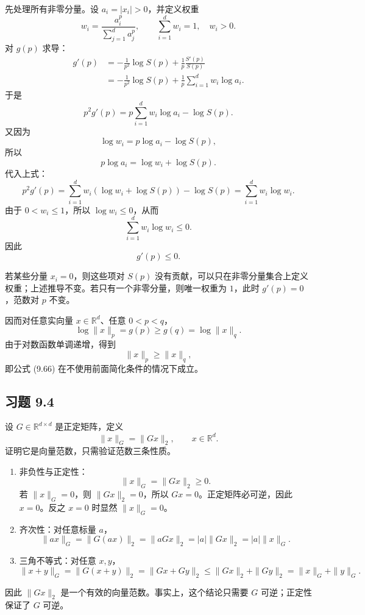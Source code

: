 \documentclass[UTF8,a4paper,12pt]{ctexart}
\begin{document}
\begin{enumerate}
  先处理所有非零分量。设 $a_i=|x_i|>0$，并定义权重
  \[
      w_i=\frac{a_i^p}{\sum_{j=1}^d a_j^p},
      \qquad \sum_{i=1}^d w_i=1,\quad w_i>0.
  \]
  对 $g(p)$ 求导：
  \begin{align*}
      g'(p)
      &=-\frac{1}{p^2}\log S(p)
        +\frac{1}{p}\frac{S'(p)}{S(p)}\\
      &=-\frac{1}{p^2}\log S(p)
        +\frac{1}{p}\sum_{i=1}^d w_i\log a_i.
  \end{align*}
  于是
  \[
      p^2g'(p)
      =
      p\sum_{i=1}^d w_i\log a_i-\log S(p).
  \]
  又因为
  \[
      \log w_i=p\log a_i-\log S(p),
  \]
  所以
  \[
      p\log a_i=\log w_i+\log S(p).
  \]
  代入上式：
  \[
      p^2g'(p)
      =
      \sum_{i=1}^d w_i(\log w_i+\log S(p))-\log S(p)
      =
      \sum_{i=1}^d w_i\log w_i.
  \]
  由于 $0<w_i\le1$，所以 $\log w_i\le0$，从而
  \[
      \sum_{i=1}^d w_i\log w_i\le0.
  \]
  因此
  \[
      g'(p)\le0.
  \]

  若某些分量 $x_i=0$，则这些项对 $S(p)$ 没有贡献，可以只在非零分量集合上定义权重；上述推导不变。若只有一个非零分量，则唯一权重为 $1$，此时 $g'(p)=0$，范数对 $p$ 不变。

  因而对任意实向量 $x\in\mathbb{R}^d$、任意 $0<p<q$，
  \[
      \log\|x\|_p=g(p)\ge g(q)=\log\|x\|_q.
  \]
  由于对数函数单调递增，得到
  \[
      \|x\|_p\ge \|x\|_q,
  \]
  即公式 (9.66) 在不使用前面简化条件的情况下成立。
\end{enumerate}

\subsection*{习题 9.4}

设 $G\in\mathbb{R}^{d\times d}$ 是正定矩阵，定义
\[
    \|x\|_G=\|Gx\|_2,\qquad x\in\mathbb{R}^d.
\]
证明它是向量范数，只需验证范数三条性质。

\begin{enumerate}
  \item 非负性与正定性：
  \[
      \|x\|_G=\|Gx\|_2\ge0.
  \]
  若 $\|x\|_G=0$，则 $\|Gx\|_2=0$，所以 $Gx=0$。正定矩阵必可逆，因此 $x=0$。反之 $x=0$ 时显然 $\|x\|_G=0$。

  \item 齐次性：对任意标量 $a$，
  \[
      \|ax\|_G=\|G(ax)\|_2=\|aGx\|_2=|a|\|Gx\|_2=|a|\|x\|_G.
  \]

  \item 三角不等式：对任意 $x,y$，
  \[
      \|x+y\|_G
      =\|G(x+y)\|_2
      =\|Gx+Gy\|_2
      \le \|Gx\|_2+\|Gy\|_2
      =\|x\|_G+\|y\|_G.
  \]
\end{enumerate}

因此 $\|Gx\|_2$ 是一个有效的向量范数。事实上，这个结论只需要 $G$ 可逆；正定性保证了 $G$ 可逆。
\end{document}
